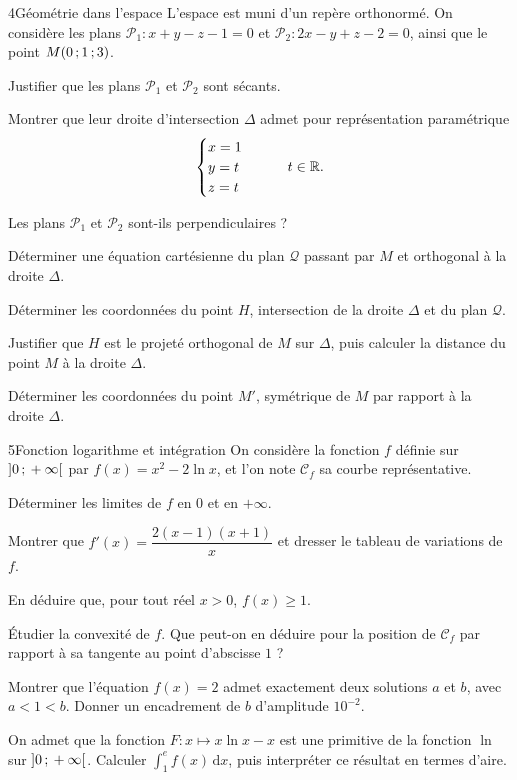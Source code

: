 \begin{exoBac}{4}{Géométrie dans l'espace}
L'espace est muni d'un repère orthonormé. On considère les plans $\mathcal{P}_1:x+y-z-1=0$ et $\mathcal{P}_2:2x-y+z-2=0$, ainsi que le
point $M(0\,{;}\,1\,{;}\,3)$.
\begin{questions}
  \item Justifier que les plans $\mathcal{P}_1$ et $\mathcal{P}_2$ sont sécants.
  \item Montrer que leur droite d'intersection $\Delta$ admet pour représentation paramétrique
    \[\begin{cases}x=1\\y=t\\z=t\end{cases}\qquad t\in\mathbb{R}.\]
  \item Les plans $\mathcal{P}_1$ et $\mathcal{P}_2$ sont-ils perpendiculaires ?
  \item Déterminer une équation cartésienne du plan $\mathcal{Q}$ passant par $M$ et orthogonal à la droite $\Delta$.
  \item Déterminer les coordonnées du point $H$, intersection de la droite $\Delta$ et du plan $\mathcal{Q}$.
  \item Justifier que $H$ est le projeté orthogonal de $M$ sur $\Delta$, puis calculer la distance du point $M$ à la droite $\Delta$.
  \item Déterminer les coordonnées du point $M'$, symétrique de $M$ par rapport à la droite $\Delta$.
\end{questions}
\end{exoBac}

\begin{exoBac}{5}{Fonction logarithme et intégration}
On considère la fonction $f$ définie sur $\mathopen{]}0\,{;}\,+\infty\mathclose{[}$ par $f(x)=x^{2}-2\ln x$, et l'on note $\mathcal{C}_f$ sa courbe représentative.
\begin{questions}
  \item Déterminer les limites de $f$ en $0$ et en $+\infty$.
  \item Montrer que $f'(x)=\dfrac{2(x-1)(x+1)}{x}$ et dresser le tableau de variations de $f$.
  \item En déduire que, pour tout réel $x>0$, $f(x)\geq1$.
  \item Étudier la convexité de $f$. Que peut-on en déduire pour la position de $\mathcal{C}_f$ par rapport à sa tangente au point
    d'abscisse $1$ ?
\end{questions}
\begin{questions}[resume]
  \item Montrer que l'équation $f(x)=2$ admet exactement deux solutions $a$ et $b$, avec $a<1<b$. Donner un encadrement de $b$
    d'amplitude $10^{-2}$.
  \item On admet que la fonction $F:x\mapsto x\ln x-x$ est une primitive de la fonction $\ln$ sur $\mathopen{]}0\,{;}\,+\infty\mathclose{[}$. Calculer
    $\int_1^{e}f(x)\,\mathrm{d}x$, puis interpréter ce résultat en termes d'aire.
\end{questions}
\end{exoBac}
